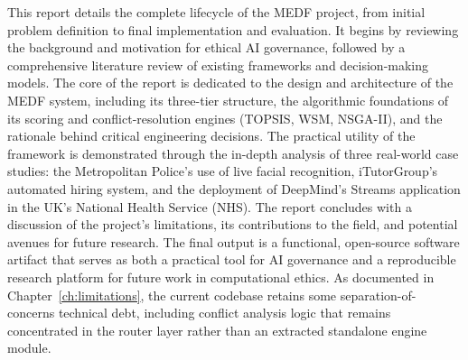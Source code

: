 This report details the complete lifecycle of the MEDF project, from initial problem definition to final implementation and evaluation. It begins by reviewing the background and motivation for ethical AI governance, followed by a comprehensive literature review of existing frameworks and decision-making models. The core of the report is dedicated to the design and architecture of the MEDF system, including its three-tier structure, the algorithmic foundations of its scoring and conflict-resolution engines (TOPSIS, WSM, NSGA-II), and the rationale behind critical engineering decisions. The practical utility of the framework is demonstrated through the in-depth analysis of three real-world case studies: the Metropolitan Police's use of live facial recognition, iTutorGroup's automated hiring system, and the deployment of DeepMind's Streams application in the UK's National Health Service (NHS). The report concludes with a discussion of the project's limitations, its contributions to the field, and potential avenues for future research. The final output is a functional, open-source software artifact that serves as both a practical tool for AI governance and a reproducible research platform for future work in computational ethics. As documented in Chapter~\ref{ch:limitations}, the current codebase retains some separation-of-concerns technical debt, including conflict analysis logic that remains concentrated in the router layer rather than an extracted standalone engine module.
